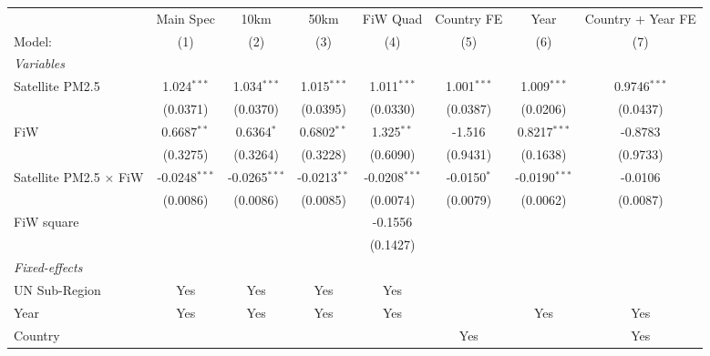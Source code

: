 
\begingroup
\centering
\begin{tabular}{lccccccc}
   \tabularnewline \midrule \midrule
                                 & Main Spec       & 10km            & 50km           & FiW Quad        & Country FE    & Year            & Country + Year FE \\   
   Model:                        & (1)             & (2)             & (3)            & (4)             & (5)           & (6)             & (7)\\  
   \midrule
   \emph{Variables}\\
   Satellite PM2.5               & 1.024$^{***}$   & 1.034$^{***}$   & 1.015$^{***}$  & 1.011$^{***}$   & 1.001$^{***}$ & 1.009$^{***}$   & 0.9746$^{***}$\\   
                                 & (0.0371)        & (0.0370)        & (0.0395)       & (0.0330)        & (0.0387)      & (0.0206)        & (0.0437)\\   
   FiW                           & 0.6687$^{**}$   & 0.6364$^{*}$    & 0.6802$^{**}$  & 1.325$^{**}$    & -1.516        & 0.8217$^{***}$  & -0.8783\\   
                                 & (0.3275)        & (0.3264)        & (0.3228)       & (0.6090)        & (0.9431)      & (0.1638)        & (0.9733)\\   
   Satellite PM2.5 $\times$ FiW  & -0.0248$^{***}$ & -0.0265$^{***}$ & -0.0213$^{**}$ & -0.0208$^{***}$ & -0.0150$^{*}$ & -0.0190$^{***}$ & -0.0106\\   
                                 & (0.0086)        & (0.0086)        & (0.0085)       & (0.0074)        & (0.0079)      & (0.0062)        & (0.0087)\\   
   FiW square                    &                 &                 &                & -0.1556         &               &                 &   \\   
                                 &                 &                 &                & (0.1427)        &               &                 &   \\   
   \midrule
   \emph{Fixed-effects}\\
   UN Sub-Region                 & Yes             & Yes             & Yes            & Yes             &               &                 & \\  
   Year                          & Yes             & Yes             & Yes            & Yes             &               & Yes             & Yes\\  
   Country                       &                 &                 &                &                 & Yes           &                 & Yes\\  

\end{tabular}
